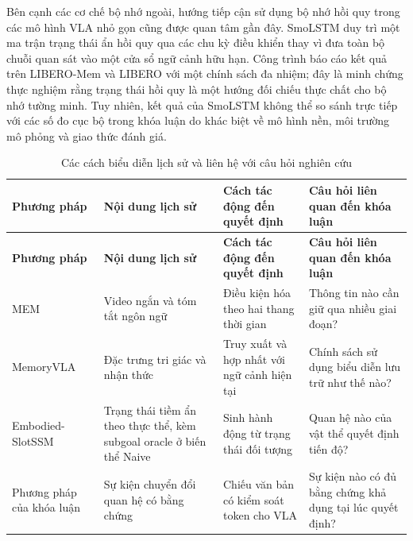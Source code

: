 Bên cạnh các cơ chế bộ nhớ ngoài, hướng tiếp cận sử dụng bộ nhớ hồi quy trong các mô hình VLA nhỏ gọn cũng được quan tâm gần đây. SmoLSTM \cite{smoLSTM2026} duy trì một ma trận trạng thái ẩn hồi quy qua các chu kỳ điều khiển thay vì đưa toàn bộ chuỗi quan sát vào một cửa sổ ngữ cảnh hữu hạn. Công trình báo cáo kết quả trên LIBERO-Mem và LIBERO với một chính sách đa nhiệm; đây là minh chứng thực nghiệm rằng trạng thái hồi quy là một hướng đối chiếu thực chất cho bộ nhớ tường minh. Tuy nhiên, kết quả của SmoLSTM không thể so sánh trực tiếp với các số đo cục bộ trong khóa luận do khác biệt về mô hình nền, môi trường mô phỏng và giao thức đánh giá.

\begingroup\small\setlength{\tabcolsep}{4pt}\renewcommand{\arraystretch}{1.15}
\begin{longtable}{>{\raggedright\arraybackslash}p{}>{\raggedright\arraybackslash}p{}>{\raggedright\arraybackslash}p{}>{\raggedright\arraybackslash}p{}}
\caption{Các cách biểu diễn lịch sử và liên hệ với câu hỏi nghiên cứu}\label{tab:generated1}\\
\toprule
\textbf{Phương pháp} & \textbf{Nội dung lịch sử} & \textbf{Cách tác động đến quyết định} & \textbf{Câu hỏi liên quan đến khóa luận} \\
\midrule\endfirsthead
\toprule
\textbf{Phương pháp} & \textbf{Nội dung lịch sử} & \textbf{Cách tác động đến quyết định} & \textbf{Câu hỏi liên quan đến khóa luận} \\
\midrule\endhead
\bottomrule\endfoot
MEM & Video ngắn và tóm tắt ngôn ngữ & Điều kiện hóa theo hai thang thời gian & Thông tin nào cần giữ qua nhiều giai đoạn? \\
MemoryVLA & Đặc trưng tri giác và nhận thức & Truy xuất và hợp nhất với ngữ cảnh hiện tại & Chính sách sử dụng biểu diễn lưu trữ như thế nào? \\
Embodied-SlotSSM & Trạng thái tiềm ẩn theo thực thể, kèm subgoal oracle ở biến thể Naive & Sinh hành động từ trạng thái đối tượng & Quan hệ nào của vật thể quyết định tiến độ? \\
Phương pháp của khóa luận & Sự kiện chuyển đổi quan hệ có bằng chứng & Chiếu văn bản có kiểm soát token cho VLA & Sự kiện nào có đủ bằng chứng khả dụng tại lúc quyết định? \\
\end{longtable}
\endgroup

